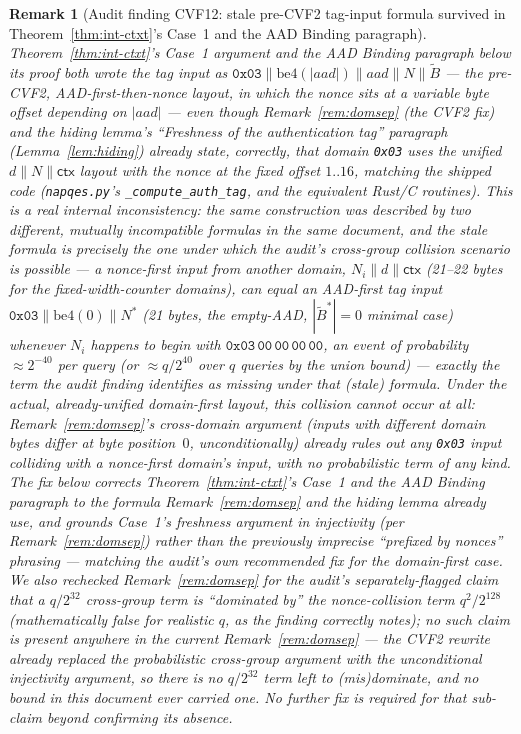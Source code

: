 \documentclass[11pt,a4paper]{article}
\newtheorem{remark}[theorem]{Remark}
\begin{document}
\begin{remark}[Audit finding CVF12: stale pre-CVF2 tag-input formula survived in Theorem~\ref{thm:int-ctxt}'s Case~1 and the AAD Binding paragraph]
\label{rem:cvf12}
Theorem~\ref{thm:int-ctxt}'s Case~1 argument and the AAD Binding paragraph
below its proof both wrote the tag input as
$\texttt{0x03}\|\mathrm{be4}(|aad|)\|aad\|N\|\widetilde{B}$ --- the
\emph{pre}-CVF2, AAD-first-then-nonce layout, in which the nonce sits at a
variable byte offset depending on $|aad|$ --- even though
Remark~\ref{rem:domsep} (the CVF2 fix) and the hiding lemma's
``Freshness of the authentication tag'' paragraph (Lemma~\ref{lem:hiding})
already state, correctly, that domain \texttt{0x03} uses the unified
$d\|N\|\mathsf{ctx}$ layout with the nonce at the fixed offset $1..16$,
matching the shipped code (\texttt{napqes.py}'s
\texttt{\_compute\_auth\_tag}, and the equivalent Rust/C routines). This
is a real internal inconsistency: the same construction was described by
two different, mutually incompatible formulas in the same document, and
the stale formula is precisely the one under which the audit's
cross-group collision scenario is possible --- a nonce-first input from
another domain, $N_i\|d\|\mathsf{ctx}$ (21--22 bytes for the
fixed-width-counter domains), can equal an AAD-first tag input
$\texttt{0x03}\|\mathrm{be4}(0)\|N^*$ (21 bytes, the empty-AAD,
$|\widetilde{B}^*|=0$ minimal case) whenever $N_i$ happens to begin with
$\texttt{0x03}\,\texttt{00}\,\texttt{00}\,\texttt{00}\,\texttt{00}$, an
event of probability $\approx 2^{-40}$ per query (or $\approx q/2^{40}$
over $q$ queries by the union bound) --- exactly the term the audit
finding identifies as missing under that (stale) formula. Under the
\emph{actual}, already-unified domain-first layout, this collision cannot
occur at all: Remark~\ref{rem:domsep}'s cross-domain argument (inputs
with different domain bytes differ at byte position~$0$, unconditionally)
already rules out any \texttt{0x03} input colliding with a nonce-first
domain's input, with no probabilistic term of any kind. The fix below
corrects Theorem~\ref{thm:int-ctxt}'s Case~1 and the AAD Binding
paragraph to the formula Remark~\ref{rem:domsep} and the hiding lemma
already use, and grounds Case~1's freshness argument in injectivity (per
Remark~\ref{rem:domsep}) rather than the previously imprecise ``prefixed
by nonces'' phrasing --- matching the audit's own recommended fix for the
domain-first case. We also rechecked Remark~\ref{rem:domsep} for the
audit's separately-flagged claim that a $q/2^{32}$ cross-group term is
``dominated by'' the nonce-collision term $q^2/2^{128}$ (mathematically
false for realistic $q$, as the finding correctly notes); no such claim is
present anywhere in the current Remark~\ref{rem:domsep} --- the CVF2
rewrite already replaced the probabilistic cross-group argument with the
unconditional injectivity argument, so there is no $q/2^{32}$ term left to
(mis)dominate, and no bound in this document ever carried one. No further
fix is required for that sub-claim beyond confirming its absence.
\end{remark}
\end{document}

